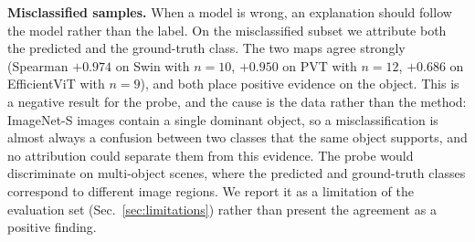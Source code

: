 \documentclass[lettersize,journal]{IEEEtran}
\theoremstyle{definition}
\theoremstyle{plain}
\begin{document}
\textbf{Misclassified samples.} When a model is wrong, an explanation should
follow the model rather than the label. On the misclassified subset we attribute
both the predicted and the ground-truth class. The two maps agree strongly
(Spearman $+0.974$ on Swin with $n{=}10$, $+0.950$ on PVT with $n{=}12$,
$+0.686$ on EfficientViT with $n{=}9$), and both place positive evidence on the
object. This is a negative result for the probe, and the cause is the data
rather than the method: ImageNet-S images contain a single dominant object, so a
misclassification is almost always a confusion between two classes that the same
object supports, and no attribution could separate them from this evidence. The
probe would discriminate on multi-object scenes, where the predicted and
ground-truth classes correspond to different image regions. We report it as a
limitation of the evaluation set (Sec.~\ref{sec:limitations}) rather than
present the agreement as a positive finding.
\end{document}
